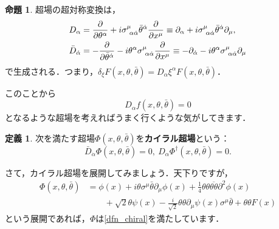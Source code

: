 \documentclass[a4paper,uplatex,dvipdfmx]{jsarticle}
\theoremstyle{definition}
\newtheorem{dfn}{定義}
\newtheorem{prop}{命題}
\begin{document}
\begin{prop}
  超場の超対称変換は，
  \begin{align}
    D_{\alpha}
    &=
    \pdv{}{\theta^{\alpha}}
    +
    i\sigma^{\mu}_{\ \alpha\dot{\alpha}}\bar{\theta}^{\dot{\alpha}}\pdv{}{x^{\mu}}
    \equiv
    \partial_{\alpha}
    +
    i\sigma^{\mu}_{\ \alpha\dot{\alpha}}\bar{\theta}^{\dot{\alpha}}\partial_{\mu}
    ,
    \\
    \bar{D}_{\dot{\alpha}}
    &=
    -
    \pdv{}{\bar{\theta}^{\dot{\alpha}}}
    -
    i\theta^{\alpha}\sigma^{\mu}_{\ \alpha\dot{\alpha}}\pdv{}{x^{\mu}}
    \equiv
    -\partial_{\dot{\alpha}}-i\theta^{\alpha}\sigma^{\mu}_{\ \alpha\dot{\alpha}}\partial_{\mu}
  \end{align}
  で生成される．つまり，$\delta_{\xi}F(x,\theta,\bar{\theta})=D_{\alpha}\xi^{\alpha}F(x,\theta,\bar{\theta})$．
\end{prop}

このことから
\begin{equation}
  D_{\alpha}f(x,\theta,\bar{\theta})
  =
  0
\end{equation}
となるような超場を考えればうまく行くような気がしてきます．

\begin{dfn}
  次を満たす超場$\Phi(x,\theta,\bar{\theta})$を\textbf{カイラル超場}という：
  \begin{equation}
    \bar{D}_{\dot{\alpha}}\Phi(x,\theta,\bar{\theta})
    =
    0
    ,\ 
    D_{\alpha}\Phi^{\dag}(x,\theta,\bar{\theta})
    =
    0
    .
    \label{dfn_chiral}
  \end{equation}
\end{dfn}

さて，カイラル超場を展開してみましょう．天下りですが，
\begin{align}
  \Phi(x,\theta,\bar{\theta})
  &=
  \phi(x)
  +
  i\theta\sigma^{\mu}\bar{\theta}\partial_{\mu}\phi(x)
  +
  \frac{1}{4}\theta\theta\overline{\theta\theta}\partial^{2}\phi(x)
  \nonumber
  \\
  &\qquad
  +
  \sqrt{2}\theta\psi(x)
  -
  \frac{i}{\sqrt{2}}\theta\theta\partial_{\mu}\psi(x)\sigma^{\mu}\bar{\theta}
  +
  \theta\theta
  F(x)
\end{align}
という展開であれば，$\Phi$は\eqref{dfn_chiral}を満たしています．
\end{document}
